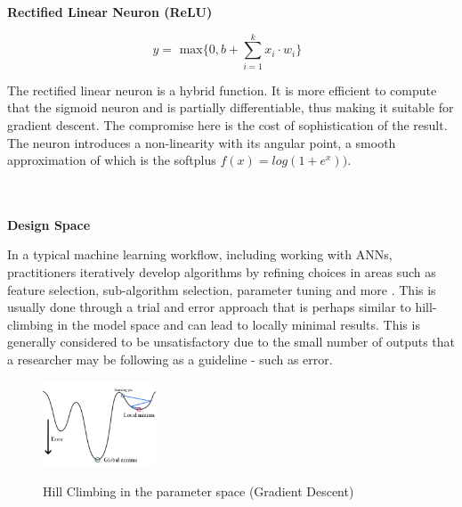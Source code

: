 \documentclass[a4paper,11pt,titlepage]{article}
\begin{document}
		\textbf{Rectified Linear Neuron (ReLU) }
		
		$$
		y = 
		\text{ max$\{0,  b + \sum\limits_{i=1}^k x_{i} \cdot w_{i}\}$ }	
		$$		
		
		The rectified linear neuron is a hybrid function. It is more efficient to compute that the sigmoid neuron and is partially differentiable, thus making it suitable for gradient descent. The compromise here is the cost of sophistication of the result. The neuron introduces a non-linearity with its angular point, a smooth approximation of which is the softplus $f(x) = log(1 + e^{x}))$.
\\\
\\\

\textbf{Design Space}
\par
		In a typical machine learning workflow, including working with ANNs, practitioners iteratively develop algorithms by refining choices in areas such as feature selection, sub-algorithm selection, parameter tuning and more \cite{Patel2008}. This is usually done through a trial and error approach that is perhaps similar to hill-climbing in the model space and can lead to locally minimal results. This is generally considered to be unsatisfactory due to the small number of outputs that a researcher may be following as a guideline - such as error.
						
		\begin{figure}[H]
    			\centering	
			{{\includegraphics[width=0.3\textwidth]
    				{img/gradient_descent.png} 
    			}}%
    			\caption{Hill Climbing in the parameter space (Gradient Descent)}%
    			\label{fig:GradDesc}
		\end{figure}	
		
\end{document}
